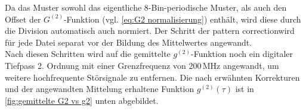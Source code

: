 Da das Muster sowohl das eigentliche 8-Bin-periodische Muster, als auch den Offset der $G^{(2)}$-Funktion (vgl. \autoref{eq:G2 normalisierung}) enthält, wird diese durch die Division automatisch auch normiert. 
Der Schritt der \glqq pattern correction\grqq\;wird für jede Datei separat vor der Bildung des Mittelwertes angewandt. \\
Nach diesen Schritten wird auf die gemittelte $g^{(2)}$-Funktion noch ein digitaler Tiefpass 2. Ordnung mit einer Grenzfrequenz von 200\,MHz angewandt, um weitere hochfrequente Störsignale zu entfernen. 
Die nach erwähnten Korrekturen und der angewandten Mittelung erhaltene Funktion $g^{(2)}(\tau)$ ist in \autoref{fig:gemittelte G2 vs g2} unten abgebildet. 

